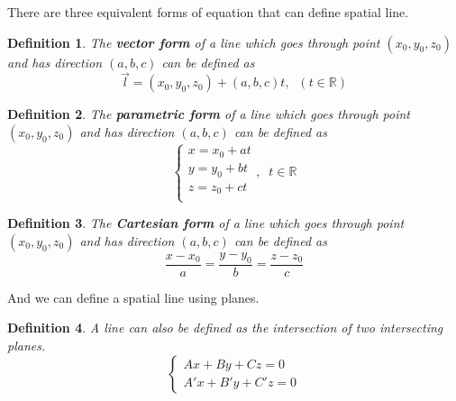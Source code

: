 \documentclass{article}
\newtheorem{definition}{Definition}
\begin{document}
There are three equivalent forms of equation that can define spatial line.
\begin{definition}
	The \textbf{vector form} of a line which goes through point $(x_0,y_0,z_0)$ and has direction $(a,b,c)$ can be defined as
	\[ \vec{l} = (x_0,y_0,z_0) + (a,b,c)t,\;\;(t\in\mathbb{R}) \]
\end{definition}


\begin{definition}
	The \textbf{parametric form} of a line which goes through point $(x_0,y_0,z_0)$ and has direction $(a,b,c)$ can be defined as
	\[ \left\{\begin{matrix}
	x=x_0 + at\\ y=y_0 + bt\\  z=z_0 + ct\\ 
	\end{matrix}\right. ,\;\;t\in\mathbb{R}  \]	
\end{definition}


\begin{definition}
	The \textbf{Cartesian form} of a line which goes through point $(x_0,y_0,z_0)$ and has direction $(a,b,c)$ can be defined as
	\[ \frac{x-x_0}{a} = \frac{y-y_0}{b} = \frac{z-z_0}{c} \]
\end{definition}

And we can define a spatial line using planes.
\begin{definition}
	A line can also be defined as the intersection of two intersecting planes.
	\[ \left\{ \begin{matrix}
	Ax + By + Cz = 0\\ A'x + B'y + C'z = 0
	\end{matrix}  \right. \]
\end{definition}
\end{document}
